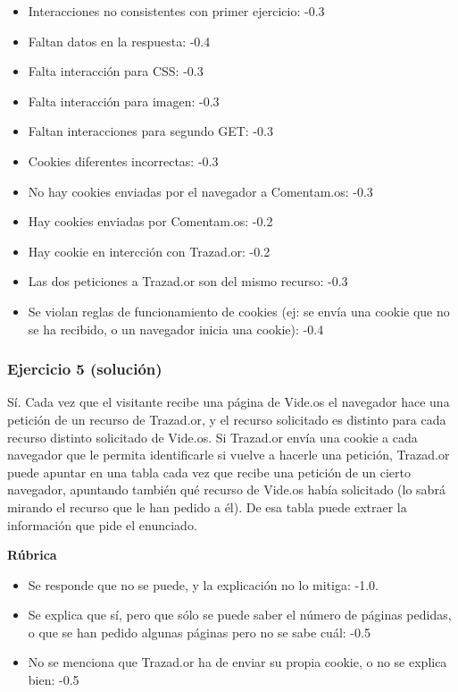 \begin{itemize}
\item Interacciones no consistentes con primer ejercicio: -0.3
\item Faltan datos en la respuesta: -0.4
\item Falta interacción para CSS: -0.3
\item Falta interacción para imagen: -0.3
\item Faltan interacciones para segundo GET: -0.3
\item Cookies diferentes incorrectas: -0.3
\item No hay cookies enviadas por el navegador a Comentam.os: -0.3
\item Hay cookies enviadas por Comentam.os: -0.2
\item Hay cookie en intercción con Trazad.or: -0.2
\item Las dos peticiones a Trazad.or son del mismo recurso: -0.3
\item Se violan reglas de funcionamiento de cookies (ej: se envía una cookie que no se ha recibido, o un navegador inicia una cookie): -0.4
\end{itemize}

\subsubsection{Ejercicio 5 (solución)}

Sí. Cada vez que el visitante recibe una página de Vide.os el navegador hace una petición de un recurso de Trazad.or, y el recurso solicitado es distinto para cada recurso distinto solicitado de Vide.os. Si Trazad.or envía una cookie a cada navegador que le permita identificarle si vuelve a hacerle una petición, Trazad.or puede apuntar en una tabla cada vez que recibe una petición de un cierto navegador, apuntando también qué recurso de Vide.os había solicitado (lo sabrá mirando el recurso que le han pedido a él). De esa tabla puede extraer la información que pide el enunciado.

\vspace{.4cm}\textbf{Rúbrica}

\begin{itemize}
\item Se responde que no se puede, y la explicación no lo mitiga: -1.0.
\item Se explica que sí, pero que sólo se puede saber el número de páginas pedidas, o que se han pedido algunas páginas pero no se sabe cuál: -0.5
\item No se menciona que Trazad.or ha de enviar su propia cookie, o no se explica bien: -0.5
\end{itemize}
